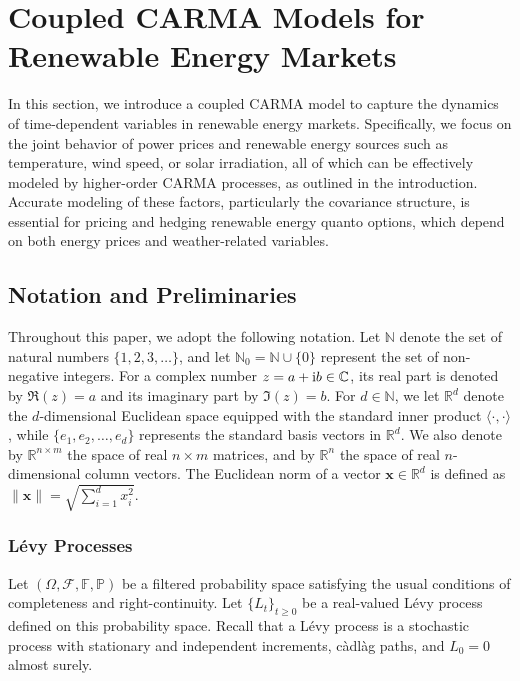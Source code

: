 \documentclass[10pt,a4paper,reqno]{amsart}
\theoremstyle{example}
\newcommand*\I{\mathop{}\!\textnormal{i}}
\begin{document}
\clearpage{}

\section{Coupled CARMA Models for Renewable Energy Markets}\label{sec:coupled-carma-models}

In this section, we introduce a coupled CARMA model to capture the dynamics of
time-dependent variables in renewable energy markets. Specifically, we focus on
the joint behavior of power prices and renewable energy sources such as
temperature, wind speed, or solar irradiation, all of which can be effectively
modeled by higher-order CARMA processes, as outlined in the
introduction. Accurate modeling of these factors, particularly the covariance
structure, is essential for pricing and hedging renewable energy quanto options,
which depend on both energy prices and weather-related variables. 

\subsection{Notation and Preliminaries}

Throughout this paper, we adopt the following notation. Let $\mathbb{N}$ denote
the set of natural numbers $\{1, 2, 3, \ldots\}$, and let
$\mathbb{N}_0 = \mathbb{N} \cup \{0\}$ represent the set of non-negative
integers. For a complex number $z = a + \I b \in \mathbb{C}$, its real part is
denoted by $\Re(z) = a$ and its imaginary part by $\Im(z) = b$. For
$d \in \mathbb{N}$, we let $\mathbb{R}^{d}$ denote the $d$-dimensional Euclidean
space equipped with the standard inner product $\langle \cdot, \cdot \rangle$,
while $\{e_1, e_2, \dots, e_d\}$ represents the standard basis vectors in
$\mathbb{R}^{d}$. We also denote by $\mathbb{R}^{n \times m}$ the space of real
$n \times m$ matrices, and by $\mathbb{R}^{n}$ the space of real $n$-dimensional
column vectors. The Euclidean norm of a vector $\mathbf{x} \in \mathbb{R}^d$ is
defined as $\| \mathbf{x} \| = \sqrt{\sum_{i=1}^d x_i^2}$.\par{}

\subsubsection{L\'evy Processes}
Let $(\Omega, \mathcal{F}, \mathbb{F}, \mathbb{P})$ be a filtered probability
space satisfying the usual conditions of completeness and right-continuity. Let
$\{L_t\}_{t \geq 0}$ be a real-valued L\'evy process defined on this probability
space. Recall that a L\'evy process is a stochastic process with stationary and
independent increments, c\`adl\`ag paths, and $L_0 = 0$ almost surely. 
\end{document}
